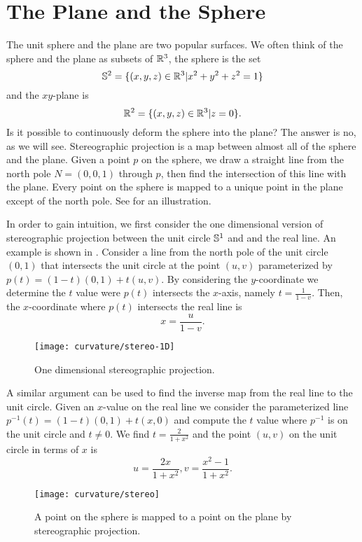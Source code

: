 \section{The Plane and the Sphere}
\label{sec:plane-sphere}


The unit sphere and the plane are two popular surfaces. 
We often think of the sphere and the plane as subsets of $\mathbb{R}^3$,
the sphere is the set
$$\mathbb{S}^2=\{(x,y,z)\in \mathbb{R}^3 | x^2+y^2+z^2=1\}$$
and the $xy$-plane is
$$\mathbb{R}^2=\{(x,y,z)\in \mathbb{R}^3 | z=0\}.$$
Is it possible to continuously deform the sphere into the plane?
The answer is no, as we will see.
Stereographic projection is a map between almost all of the sphere
and the plane. Given a point $p$ on the sphere, we draw a straight line
from the north pole $N=(0,0,1)$ through $p$, then find the intersection of
this line with the plane. Every point on the sphere is mapped
to a unique point in the plane except of the north pole.
See  for an illustration.



In order to gain intuition, we first consider the one dimensional version of stereographic
projection between the unit circle $\mathbb{S}^1$ and and the real line. An example is shown
in .
Consider a line from the north pole of the unit circle $(0,1)$ that intersects
the unit circle at the point $(u,v)$ parameterized by $p(t)=(1-t)(0,1)+t(u,v).$
By considering the $y$-coordinate we determine the $t$ value were $p(t)$
intersects the $x$-axis, namely $t=\frac{1}{1-v}.$ Then, 
the $x$-coordinate where $p(t)$ intersects the real line is 
$$x=\frac{u}{1-v}.$$

\begin{figure}[htb]
	\centering
	\texttt{[image: curvature/stereo-1D]}
	\caption{One dimensional stereographic projection.}
	\label{fig:stereo1D}
\end{figure}

A similar argument can be used to find the inverse map from
the real line to the unit circle. Given an $x$-value on the real line we consider
the parameterized line $p^{-1}(t)=(1-t)(0,1)+t(x,0)$ and compute
the $t$ value where $p^{-1}$ is on the unit circle and $t\neq 0.$ We find
$t=\frac{2}{1+x^2}$ and the point $(u,v)$ on the unit circle in terms of $x$ is
$$u=\frac{2x}{1+x^2}, v=\frac{x^2-1}{1+x^2}.$$

\begin{figure}[htb]
	\centering
	\texttt{[image: curvature/stereo]}
	\caption{A point on the sphere is mapped to a point on the plane by stereographic projection.}
	\label{fig:stereo1}
\end{figure}


